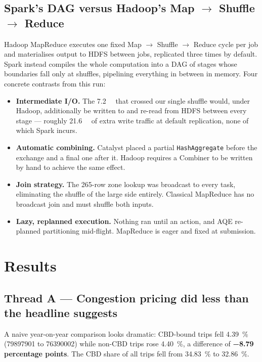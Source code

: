 \documentclass[10pt,a4paper]{article}
\begin{document}
\subsection{Spark's DAG versus Hadoop's Map $\to$ Shuffle $\to$ Reduce}

Hadoop MapReduce executes one fixed Map $\to$ Shuffle $\to$ Reduce cycle per
job and materialises output to HDFS between jobs, replicated three times by
default. Spark instead compiles the whole computation into a DAG of stages whose
boundaries fall only at shuffles, pipelining everything in between in memory.
Four concrete contrasts from this run:

\begin{itemize}\itemsep1pt \parskip0pt
\item \textbf{Intermediate I/O.} The \SI{7.2}{\gibi\byte} that crossed our single
shuffle would, under Hadoop, additionally be written to and re-read from HDFS
between every stage --- roughly \SI{21.6}{\gibi\byte} of extra write traffic at
default replication, none of which Spark incurs.
\item \textbf{Automatic combining.} Catalyst placed a partial
\texttt{HashAggregate} before the exchange and a final one after it. Hadoop
requires a Combiner to be written by hand to achieve the same effect.
\item \textbf{Join strategy.} The 265-row zone lookup was broadcast to every
task, eliminating the shuffle of the large side entirely. Classical MapReduce has
no broadcast join and must shuffle both inputs.
\item \textbf{Lazy, replanned execution.} Nothing ran until an action, and AQE
re-planned partitioning mid-flight. MapReduce is eager and fixed at submission.
\end{itemize}

\section{Results}

\subsection{Thread A --- Congestion pricing did less than the headline suggests}

A naive year-on-year comparison looks dramatic: CBD-bound trips fell
\SI{4.39}{\percent} (\num{79897901} to \num{76390002}) while non-CBD trips rose
\SI{4.40}{\percent}, a difference of \textbf{\num{-8.79} percentage points}. The
CBD share of all trips fell from \SI{34.83}{\percent} to \SI{32.86}{\percent}.
\end{document}
